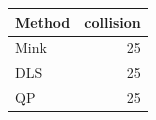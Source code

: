 \begin{tabular}{lr}
\toprule
Method & collision\\
\midrule
Mink & 25\\
DLS & 25\\
QP & 25\\
\bottomrule
\end{tabular}

